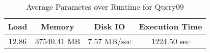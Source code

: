 \documentclass[../../main.tex]{subfiles}
\begin{document}
\begin{minipage}{.5\textwidth}
    \end{minipage}
    \begin{table}
        \begin{center}
            \begin{tabular}{ |c|c|c|c| } 
            \hline
            Load & Memory & Disk IO & Execution Time\\
            \hline
            12.86 & 37540.41 MB & 7.57 MB/sec & 1224.50 sec \\
            \hline
            \end{tabular}
            \\[1pt]
            \caption{Average Parametes over Runtime for Query09}
        \end{center}
    \end{table}
    \pagebreak
\end{document}
